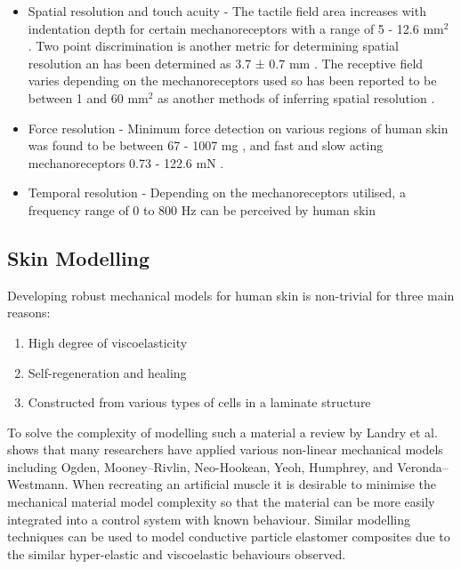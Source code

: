 \begin{itemize}
    \item Spatial resolution and touch acuity - The tactile field area increases with indentation depth for certain mechanoreceptors with a range of 5 - 12.6 mm$^2$ \cite{Deflorio2022}. Two point discrimination is another metric for determining spatial resolution an has been determined as 3.7 ± 0.7 mm \cite{Yokota2020}. The receptive field varies depending on the mechanoreceptors used so has been reported to be between 1 and 60 mm$^2$ as another methods of inferring spatial resolution \cite{Roudaut2012}.
    \item Force resolution - Minimum force detection on various regions of human skin was found to be between 67 - 1007 mg \cite{Ackerley2014}, and fast and slow acting  mechanoreceptors 0.73 - 122.6 mN \cite{Strzalkowski2015}.
    \item Temporal resolution - Depending on the mechanoreceptors utilised, a frequency range of 0 to 800 Hz can be perceived by human skin \cite{Deflorio2022}
\end{itemize}


\subsection{Skin Modelling}
Developing robust mechanical models for human skin is non-trivial for three main reasons:
\begin{enumerate}
    \item High degree of viscoelasticity
    \item Self-regeneration and healing
    \item Constructed from various types of cells in a laminate structure 
\end{enumerate}
To solve the complexity of modelling such a material a review by Landry et al. \cite{Landry2021} shows that many researchers have applied various non-linear mechanical models including Ogden, Mooney–Rivlin, Neo-Hookean, Yeoh, Humphrey, and Veronda–Westmann. When recreating an artificial muscle it is desirable to minimise the mechanical material model complexity so that the material can be more easily integrated into a control system with known behaviour. Similar modelling techniques can be used to model conductive particle elastomer composites due to the similar hyper-elastic and viscoelastic behaviours observed.



